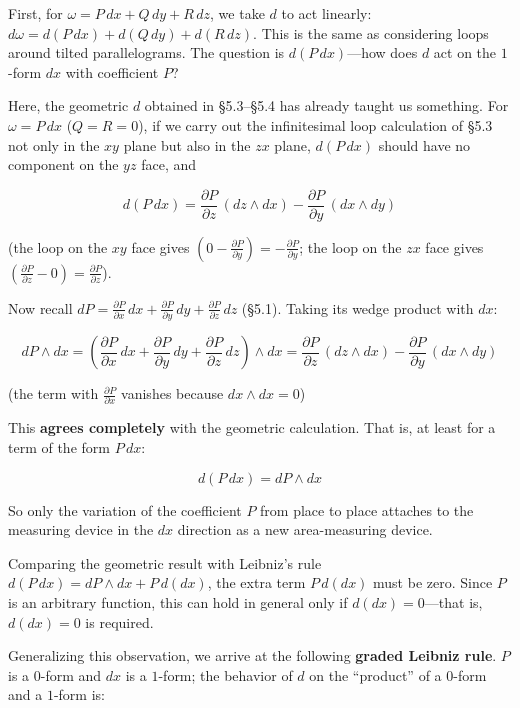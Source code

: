 First, for \(\omega = P\,dx + Q\,dy + R\,dz\), we take \(d\) to act
linearly: \(d\omega = d(P\,dx) + d(Q\,dy) + d(R\,dz)\). This is the same
as considering loops around tilted parallelograms. The question is
\(d(P\,dx)\)---how does \(d\) act on the \(1\)-form \(dx\) with
coefficient \(P\)?

Here, the geometric \(d\) obtained in §5.3--§5.4 has already taught us
something. For \(\omega = P\,dx\) (\(Q=R=0\)), if we carry out the
infinitesimal loop calculation of §5.3 not only in the \(xy\) plane but
also in the \(zx\) plane, \(d(P\,dx)\) should have no component on the
\(yz\) face, and

\[d(P\,dx) = \frac{\partial P}{\partial z}\,(dz \wedge dx) - \frac{\partial P}{\partial y}\,(dx \wedge dy)\]

(the loop on the \(xy\) face gives
\((0 - \frac{\partial P}{\partial y}) = -\frac{\partial P}{\partial y}\);
the loop on the \(zx\) face gives
\((\frac{\partial P}{\partial z} - 0) = \frac{\partial P}{\partial z}\)).

Now recall
\(dP = \frac{\partial P}{\partial x}\,dx + \frac{\partial P}{\partial y}\,dy + \frac{\partial P}{\partial z}\,dz\)
(§5.1). Taking its wedge product with \(dx\):

\[dP \wedge dx = (\frac{\partial P}{\partial x}\,dx + \frac{\partial P}{\partial y}\,dy + \frac{\partial P}{\partial z}\,dz) \wedge dx = \frac{\partial P}{\partial z}\,(dz \wedge dx) - \frac{\partial P}{\partial y}\,(dx \wedge dy)\]

(the term with \(\frac{\partial P}{\partial x}\) vanishes because
\(dx \wedge dx = 0\))

This \textbf{agrees completely} with the geometric calculation. That is,
at least for a term of the form \(P\,dx\):

\[d(P\,dx) = dP \wedge dx\]

So only the variation of the coefficient \(P\) from place to place
attaches to the measuring device in the \(dx\) direction as a new
area-measuring device.

Comparing the geometric result with Leibniz's rule
\(d(P\,dx) = dP \wedge dx + P\,d(dx)\), the extra term \(P\,d(dx)\) must
be zero. Since \(P\) is an arbitrary function, this can hold in general
only if \(d(dx)=0\)---that is, \(d(dx) = 0\) is required.

Generalizing this observation, we arrive at the following
\textbf{graded Leibniz rule}. \(P\) is a \(0\)-form and \(dx\) is a
\(1\)-form; the behavior of \(d\) on the ``product'' of a \(0\)-form and
a \(1\)-form is:

